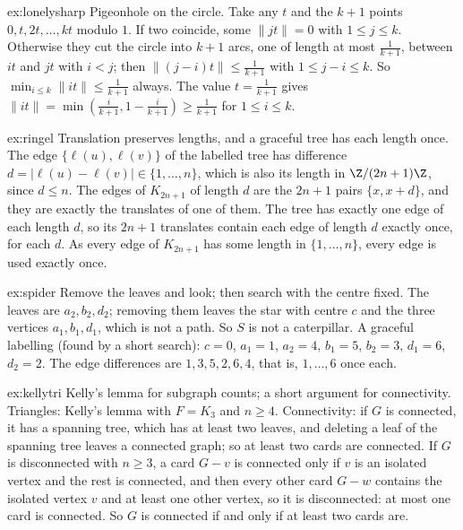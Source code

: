 \begin{solution}{ex:lonelysharp}
\idea Pigeonhole on the circle.
\writeup Take any $t$ and the $k+1$ points $0,t,2t,\dots,kt$ modulo $1$. If two coincide, some $\|jt\|=0$ with $1\le j\le k$. Otherwise they cut the circle into $k+1$ arcs, one of length at most $\frac1{k+1}$, between $it$ and $jt$ with $i<j$; then $\|(j-i)t\|\le\frac1{k+1}$ with $1\le j-i\le k$. So $\min_{i\le k}\|it\|\le\frac1{k+1}$ always. The value $t=\frac1{k+1}$ gives $\|it\|=\min(\frac i{k+1},1-\frac i{k+1})\ge\frac1{k+1}$ for $1\le i\le k$.
\end{solution}

\begin{solution}{ex:ringel}
\idea Translation preserves lengths, and a graceful tree has each length once.
\writeup The edge $\{\ell(u),\ell(v)\}$ of the labelled tree has difference $d=|\ell(u)-\ell(v)|\in\{1,\dots,n\}$, which is also its length in $\Z/(2n+1)\Z$, since $d\le n$. The edges of $K_{2n+1}$ of length $d$ are the $2n+1$ pairs $\{x,x+d\}$, and they are exactly the translates of one of them. The tree has exactly one edge of each length $d$, so its $2n+1$ translates contain each edge of length $d$ exactly once, for each $d$. As every edge of $K_{2n+1}$ has some length in $\{1,\dots,n\}$, every edge is used exactly once.
\end{solution}

\begin{solution}{ex:spider}
\idea Remove the leaves and look; then search with the centre fixed.
\writeup The leaves are $a_2,b_2,d_2$; removing them leaves the star with centre $c$ and the three vertices $a_1,b_1,d_1$, which is not a path. So $S$ is not a caterpillar. A graceful labelling (found by a short search): $c=0$, $a_1=1$, $a_2=4$, $b_1=5$, $b_2=3$, $d_1=6$, $d_2=2$. The edge differences are $1,3,5,2,6,4$, that is, $1,\dots,6$ once each.
\end{solution}

\begin{solution}{ex:kellytri}
\idea Kelly's lemma for subgraph counts; a short argument for connectivity.
\writeup Triangles: Kelly's lemma with $F=K_3$ and $n\ge4$. Connectivity: if $G$ is connected, it has a spanning tree, which has at least two leaves, and deleting a leaf of the spanning tree leaves a connected graph; so at least two cards are connected. If $G$ is disconnected with $n\ge3$, a card $G-v$ is connected only if $v$ is an isolated vertex and the rest is connected, and then every other card $G-w$ contains the isolated vertex $v$ and at least one other vertex, so it is disconnected: at most one card is connected. So $G$ is connected if and only if at least two cards are.
\end{solution}

